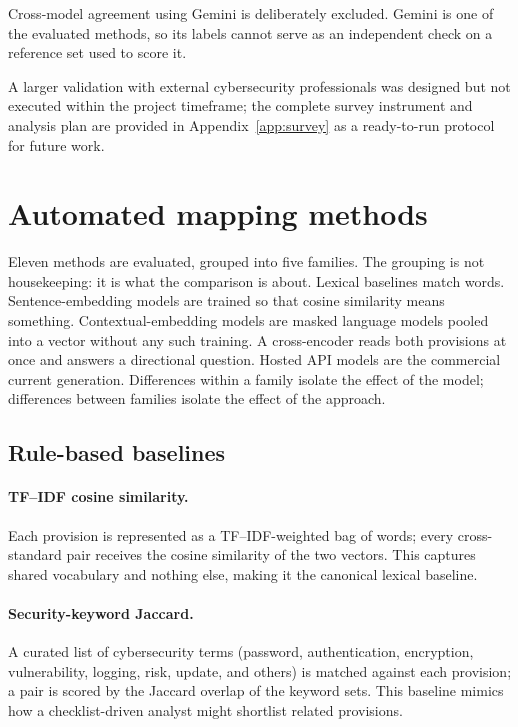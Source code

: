 Cross-model agreement using Gemini is deliberately excluded. Gemini is one of the
evaluated methods, so its labels cannot serve as an independent check on a
reference set used to score it.

A larger validation with external cybersecurity professionals was designed but
not executed within the project timeframe; the complete survey instrument and
analysis plan are provided in Appendix~\ref{app:survey} as a ready-to-run
protocol for future work.

\section{Automated mapping methods}\label{sec:methods}

Eleven methods are evaluated, grouped into five families. The grouping is not
housekeeping: it is what the comparison is about. Lexical baselines match
words. Sentence-embedding models are trained so that cosine similarity means
something. Contextual-embedding models are masked language models pooled into a
vector without any such training. A cross-encoder reads both provisions at once
and answers a directional question. Hosted API models are the commercial
current generation. Differences within a family isolate the effect of the
model; differences between families isolate the effect of the approach.

\subsection{Rule-based baselines}

\paragraph{TF--IDF cosine similarity.} Each provision is represented as a
TF--IDF-weighted bag of words; every cross-standard pair receives the cosine
similarity of the two vectors. This captures shared vocabulary and nothing
else, making it the canonical lexical baseline.

\paragraph{Security-keyword Jaccard.} A curated list of cybersecurity terms
(password, authentication, encryption, vulnerability, logging, risk, update,
and others) is matched against each provision; a pair is scored by the Jaccard
overlap of the keyword sets. This baseline mimics how a checklist-driven
analyst might shortlist related provisions.

